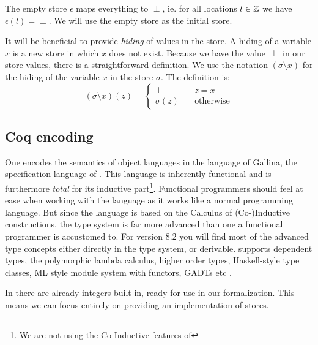 The empty store $\epsilon$ maps everything to $\perp$, ie. for all
locations $l \in \mathbb{Z}$ we have $\epsilon(l) = \perp$. We will use the
empty store as the initial store.

It will be beneficial to provide \emph{hiding} of values in the store. A
hiding of a variable $x$ is a new store in which $x$ does not
exist. Because we have the value $\perp$ in our store-values, there is
a straightforward definition. We use the notation $(\sigma \setminus x)$
for the hiding of the variable $x$ in the store $\sigma$. The definition
is:
\begin{equation*}
  (\sigma \setminus x)(z) = \begin{cases}
    \perp & \quad z = x\\
    \sigma(z) & \quad \text{otherwise}
  \end{cases}
\end{equation*}

\subsection{Coq encoding}

One encodes the semantics of object languages in the language of
Gallina, the specification language of \coq{}. This language is
inherently functional and is furthermore \emph{total} for its
inductive part\footnote{We are not using the Co-Inductive features of
  \coq{}}. Functional programmers should feel at ease when working
with the language as it works like a normal programming language. But
since the language is based on the Calculus of (Co-)Inductive
constructions, the type system is far more advanced than one a
functional programmer is accustomed to. For \coq{} version 8.2 you
will find most of the advanced type concepts either directly in the
type system, or derivable. \coq{} supports dependent types, the
polymorphic lambda calculus, higher order types, Haskell-style type
classes, ML style module system with functors, GADTs
etc \cite{pierce:attapl, pierce:tapl, wadler+1996:type-classes, milner+1997:ml-definition}.

In \coq{} there are already integers built-in, ready for use in our
formalization. This means we can focus entirely on providing an
implementation of stores.

